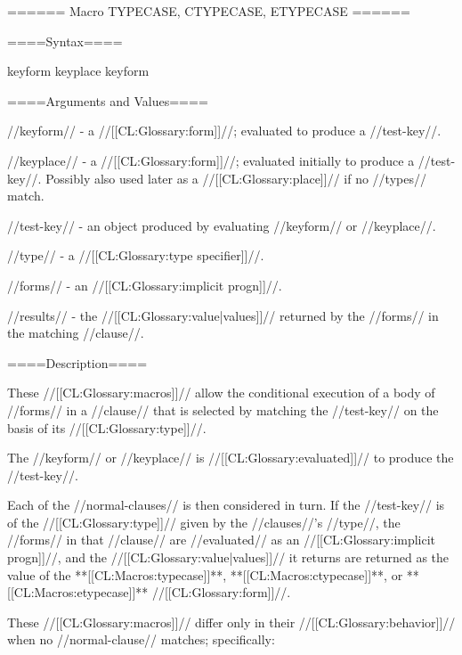 ====== Macro TYPECASE, CTYPECASE, ETYPECASE ======

====Syntax====

 {keyform  } {}  {keyplace } {}  {keyform } {}

   

====Arguments and Values====

//keyform// - a //[[CL:Glossary:form]]//; evaluated to produce a //test-key//.

//keyplace// - a //[[CL:Glossary:form]]//; evaluated initially to produce a //test-key//. Possibly also used later as a //[[CL:Glossary:place]]// if no //types// match.

//test-key// - an object produced by evaluating //keyform// or //keyplace//.

//type// - a //[[CL:Glossary:type specifier]]//.

//forms// - an //[[CL:Glossary:implicit progn]]//.

//results// - the //[[CL:Glossary:value|values]]// returned by the //forms// in the matching //clause//.

====Description====

These //[[CL:Glossary:macros]]// allow the conditional execution of a body of //forms// in a //clause// that is selected by matching the //test-key// on the basis of its //[[CL:Glossary:type]]//.

The //keyform// or //keyplace// is //[[CL:Glossary:evaluated]]// to produce the //test-key//.

Each of the //normal-clauses// is then considered in turn. If the //test-key// is of the //[[CL:Glossary:type]]// given by the //clauses//'s //type//, the //forms// in that //clause// are //evaluated// as an //[[CL:Glossary:implicit progn]]//, and the //[[CL:Glossary:value|values]]// it returns are returned as the value of the **[[CL:Macros:typecase]]**, **[[CL:Macros:ctypecase]]**, or **[[CL:Macros:etypecase]]** //[[CL:Glossary:form]]//.

These //[[CL:Glossary:macros]]// differ only in their //[[CL:Glossary:behavior]]// when no //normal-clause// matches; specifically:

